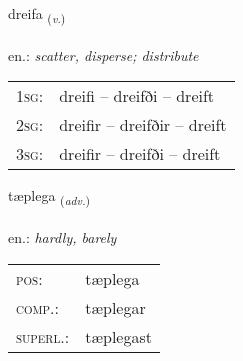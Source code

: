 \documentclass[frontgrid, backgrid]{flacards}\usepackage[]{graphicx}\usepackage[]{xcolor}
\begin{document}
\renewcommand{\flhead}{\vskip5pt \fboxsep=0pt {\small\bfseries\footnotesize Sagnorð | Verb}}
\renewcommand{\fcfoot}{\vskip5pt \fboxsep=0pt \hspace{2pt}{\small\bfseries\footnotesize 2K}}

\renewcommand{\blhead}{\vskip5pt {\small\bfseries\footnotesize Sagnorð | Verb }}
\renewcommand{\bcfoot}{\vskip5pt \hspace{2pt}{\small\bfseries\footnotesize 2K}}


{dreifa \small{\textsubscript{(\textit{v.})}} \\[1ex] %
\textphonetic{[treiːva]} \\
en.: \emph{scatter, disperse; distribute} \\  [2ex]
\renewcommand*{\arraystretch}{0.8}
\begin{tabular}{p{1cm}l}
\textsc{1sg}: & dreifi -- dreifði -- dreift \\ 
\textsc{2sg}: & dreifir -- dreifðir -- dreift \\ 
\textsc{3sg}: & dreifir -- dreifði -- dreift \\ 
\end{tabular}
}

\renewcommand{\flhead}{\vskip5pt \fboxsep=0pt {\small\bfseries\footnotesize Atviksorð | Adverb}}
\renewcommand{\fcfoot}{\vskip5pt \fboxsep=0pt \hspace{2pt}{\small\bfseries\footnotesize 2K}}

\renewcommand{\blhead}{\vskip5pt {\small\bfseries\footnotesize Atviksorð | Adverb }}
\renewcommand{\bcfoot}{\vskip5pt \hspace{2pt}{\small\bfseries\footnotesize 2K}}


{tæplega \small{\textsubscript{(\textit{adv.})}} \\[1ex] %
\textphonetic{[tʰaiplɛɣa]} \\
en.: \emph{hardly, barely} \\  [2ex]
\renewcommand*{\arraystretch}{0.8}
\begin{tabular}{ll}
\textsc{pos}: & tæplega \\ 
\textsc{comp.}: & tæplegar \\ 
\textsc{superl.}: & tæplegast \\
\end{tabular}
}
\end{document}
